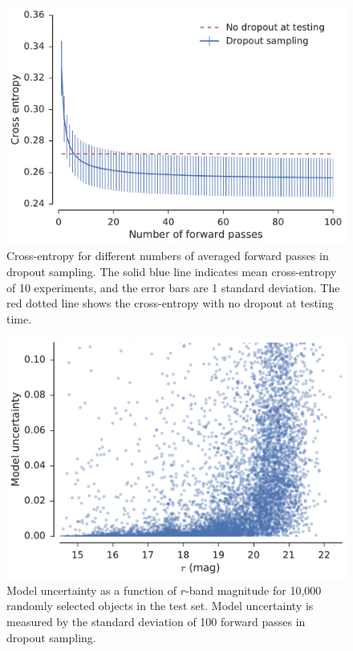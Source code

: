 \documentclass[fleqn,usenatbib]{mnras}
\begin{document}
\begin{figure}
  \centering
  \includegraphics[width=\columnwidth]{figures/mcmc_loss.pdf}
  \caption{
    Cross-entropy for different numbers of averaged forward passes in dropout sampling.
    The solid blue line indicates mean cross-entropy of 10 experiments, and the error bars are 1 standard deviation.
    The red dotted line shows the cross-entropy with no dropout at testing time.
    }
  \label{fig:mcmc_loss}
\end{figure}

\begin{figure}
  \centering
  \includegraphics[width=\columnwidth]{figures/uncertainty_vs_mag.pdf}
  \caption{
    Model uncertainty as a function of $r$-band magnitude for 10,000 randomly selected objects in the test set.
    Model uncertainty is measured by the standard deviation of 100 forward passes in dropout sampling.
    }
  \label{fig:uncertainty_vs_mag}
\end{figure}
\end{document}
